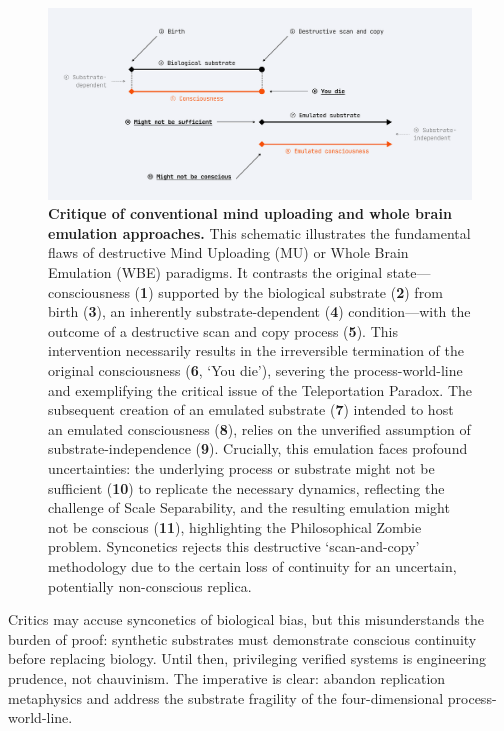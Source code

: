 \documentclass[10pt]{article}
\begin{document}
\begin{sloppypar}
  \begin{figure}[ht!]
    \centering
    \includegraphics[width=\textwidth]{figures/mu-wbe-critique.png}
    \caption[Critique of conventional mind uploading and whole brain emulation approaches]{\textbf{Critique of conventional mind uploading and whole brain emulation approaches.} This schematic illustrates the fundamental flaws of destructive Mind Uploading (MU) or Whole Brain Emulation (WBE) paradigms. It contrasts the original state—consciousness (\textbf{1}) supported by the biological substrate (\textbf{2}) from birth (\textbf{3}), an inherently substrate-dependent (\textbf{4}) condition—with the outcome of a destructive scan and copy process (\textbf{5}). This intervention necessarily results in the irreversible termination of the original consciousness (\textbf{6}, ‘You die’), severing the process-world-line and exemplifying the critical issue of the Teleportation Paradox. The subsequent creation of an emulated substrate (\textbf{7}) intended to host an emulated consciousness (\textbf{8}), relies on the unverified assumption of substrate-independence (\textbf{9}). Crucially, this emulation faces profound uncertainties: the underlying process or substrate might not be sufficient (\textbf{10}) to replicate the necessary dynamics, reflecting the challenge of Scale Separability, and the resulting emulation might not be conscious (\textbf{11}), highlighting the Philosophical Zombie problem. Synconetics rejects this destructive ‘scan-and-copy’ methodology due to the certain loss of continuity for an uncertain, potentially non-conscious replica.}
    \label{fig:mu-wbe-critique}
  \end{figure}

  Critics may accuse synconetics of biological bias, but this misunderstands the burden of proof: synthetic substrates must demonstrate conscious continuity before replacing biology. Until then, privileging verified systems is engineering prudence, not chauvinism. The imperative is clear: abandon replication metaphysics and address the substrate fragility of the four-dimensional process-world-line.


\end{sloppypar}
\end{document}
